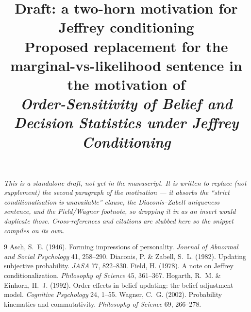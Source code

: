 \documentclass[11pt,a4paper]{article}
\title{Draft: a two-horn motivation for Jeffrey conditioning\\
\large Proposed replacement for the marginal-vs-likelihood sentence in the
motivation of\\ \emph{Order-Sensitivity of Belief and Decision Statistics under
Jeffrey Conditioning}}
\author{}
\date{}
\begin{document}
\renewcommand{\ref}[1]{\textnormal{2.2}}
\maketitle
\vspace{-2.4em}

\begin{center}\small\itshape
This is a standalone draft, not yet in the manuscript. It is written to
\emph{replace} (not supplement) the second paragraph of the motivation --- it
absorbs the ``strict conditionalisation is unavailable'' clause, the
Diaconis--Zabell uniqueness sentence, and the Field/Wagner footnote, so dropping
it in as an insert would duplicate those. Cross-references and citations are
stubbed here so the snippet compiles on its own.
\end{center}

\bigskip


\bigskip

\begin{thebibliography}{9}
Asch, S.~E. (1946). Forming impressions of
  personality. \emph{Journal of Abnormal and Social Psychology} 41, 258--290.
Diaconis, P. \& Zabell,
  S.~L. (1982). Updating subjective probability. \emph{JASA} 77, 822--830.
Field, H. (1978). A note on Jeffrey
  conditionalization. \emph{Philosophy of Science} 45, 361--367.
Hogarth, R.~M. \& Einhorn,
  H.~J. (1992). Order effects in belief updating: the belief-adjustment model.
  \emph{Cognitive Psychology} 24, 1--55.
Wagner, C.~G. (2002). Probability kinematics
  and commutativity. \emph{Philosophy of Science} 69, 266--278.
\end{thebibliography}
\end{document}
